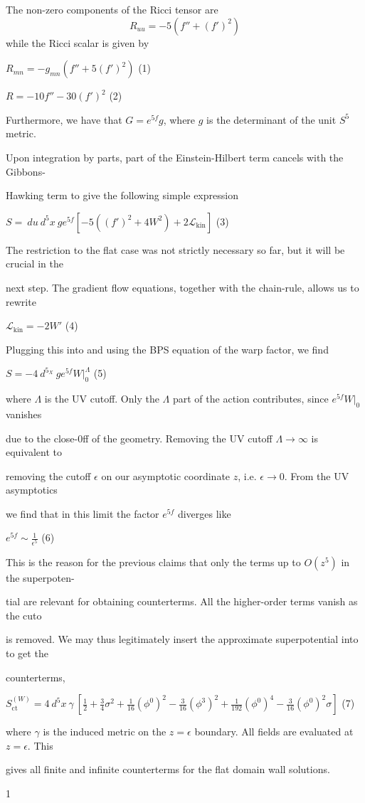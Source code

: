 \documentclass[a4paper,12pt]{article}
\begin{document}
The non-zero components of the Ricci tensor are
$$
R_{uu}=-5(f''+(f')^{2})
$$
while the Ricci scalar is given by

$R_{mn}=-g_{mn}(f''+5(f')^{2})$ (1)
\begin{center}
$R=-10f''-30(f')^{2}$   (2)
\end{center}
Furthermore, we have that $G=e^{5f} g$, where $g$ is the determinant of the unit $S^{5}$ metric.

Upon integration by parts, part of the Einstein-Hilbert term cancels with the Gibbons-

Hawking term to give the following simple expression
\begin{center}
$S=\ du\ d^{5}x\ ge^{5f}[-5((f')^{2}+4W^{2})+2\mathcal{L}_{\mathrm{k}\mathrm{i}\mathrm{n}}]$   (3)
\end{center}
The restriction to the flat case was not strictly necessary so far, but it will be crucial in the

next step. The gradient flow equations, together with the chain-rule, allows us to rewrite
\begin{center}
$\mathcal{L}_{\mathrm{k}\mathrm{i}\mathrm{n}}=-2W'$   (4)
\end{center}
Plugging this into and using the BPS equation of the warp factor, we find
\begin{center}
$S=-4\ d^{5_{X}}\ ge^{5f}W|_{0}^{\Lambda}$   (5)
\end{center}
where $\Lambda$ is the UV cutoff. Only the $\Lambda$ part of the action contributes, since $e^{5f}W|_{0}$ vanishes

due to the close-0ff of the geometry. Removing the UV cutoff $\Lambda \rightarrow \infty$ is equivalent to

removing the cutoff $\epsilon$ on our asymptotic coordinate $z$, i.e. $\epsilon\rightarrow 0$. From the UV asymptotics

we find that in this limit the factor $e^{5f}$ diverges like
\begin{center}
$e^{5f}\displaystyle \sim\frac{1}{\epsilon^{5}}$   (6)
\end{center}
This is the reason for the previous claims that only the terms up to $O(z^{5})$ in the superpoten-

tial are relevant for obtaining counterterms. All the higher-order terms vanish as the cuto

is removed. We may thus legitimately insert the approximate superpotential into to get the

counterterms,
\begin{center}
$S_{\mathrm{c}\mathrm{t}}^{(W)}=4\displaystyle \ d^{5}x\ \gamma\ [\frac{1}{2}+\frac{3}{4}\sigma^{2}+\frac{1}{16}(\phi^{0})^{2}-\frac{3}{16}(\phi^{3})^{2}+\frac{1}{192}(\phi^{0})^{4}-\frac{3}{16}(\phi^{0})^{2}\sigma]$   (7)
\end{center}
where $\gamma$ is the induced metric on the $ z=\epsilon$ boundary. All fields are evaluated at $ z=\epsilon$. This

gives all finite and infinite counterterms for the flat domain wall solutions.

1
\end{document}

